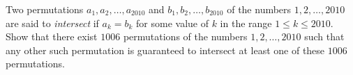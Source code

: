 Two permutations $a_1,a_2,\ldots,a_{2010}$ and $b_1,b_2,\ldots,b_{2010}$ of the numbers $1,2,\ldots,2010$ are said to \emph{intersect} if $a_k=b_k$ for some value of $k$ in the range $1\leq k\leq2010$. Show that there exist $1006$ permutations of the numbers $1,2,\ldots,2010$ such that any other such permutation is guaranteed to intersect at least one of these $1006$ permutations.